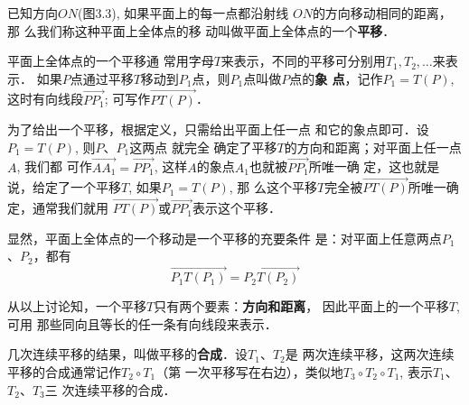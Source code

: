 已知方向$ON$(图3.3), 如果平面上的每一点都沿射线
$ON$的方向移动相同的距离，那
么我们称这种平面上全体点的移
动叫做平面上全体点的一个\textbf{平移}．

\begin{figure}[htp]\centering
    \begin{minipage}[t]{0.48\textwidth}
    \centering
{}
    \caption{}
    \end{minipage}
    \begin{minipage}[t]{0.48\textwidth}
    \centering
    \caption{}
    \end{minipage}
    \end{figure}

平面上全体点的一个平移通
常用字母$T$来表示，不同的平移可分别用$T_1,T_2,\ldots$来表示．
如果$P$点通过平移$T$移动到$P_1$点，则$P_1$点叫做$P$点的\textbf{象
点}，记作$P_1=T(P)$, 这时有向线段$\Vec{PP_1}$; 可写作$\Vec{PT(P)}$．

为了给出一个平移，根据定义，只需给出平面上任一点
和它的象点即可．设$P_1=T(P)$, 则$P$、$P_1$这两点 就完全
确定了平移$T$的方向和距离；对平面上任一点$A$, 我们都
可作$\Vec{AA_1}=\Vec{PP_1}$, 这样$A$的象点$A_1$也就被$\Vec{PP_1}$所唯一确
定，这也就是说，给定了一个平移$T$, 如果$P_1=T(P)$, 那
么这个平移$T$完全被$\Vec{PT(P)}$所唯一确定，通常我们就用
$\Vec{PT(P)}$或$\Vec{PP_1}$表示这个平移．

显然，平面上全体点的一个移动是一个平移的充要条件
是：对平面上任意两点$P_1$、$P_2$，都有
\[\Vec{P_1T(P_1)}=\Vec{P_2T(P_2)}\]

从以上讨论知，一个平移$T$只有两个要素：\textbf{方向和距离}，
因此平面上的一个平移$T$, 可用
那些同向且等长的任一条有向线段来表示．

几次连续平移的结果，叫做平移的\textbf{合成}．设$T_1$、$T_2$是
两次连续平移，这两次连续平移的合成通常记作$T_2\circ T_1$（第
一次平移写在右边），类似地$T_3\circ T_2\circ T_1$, 表示$T_1$、$T_2$、$T_3$三
次连续平移的合成．

